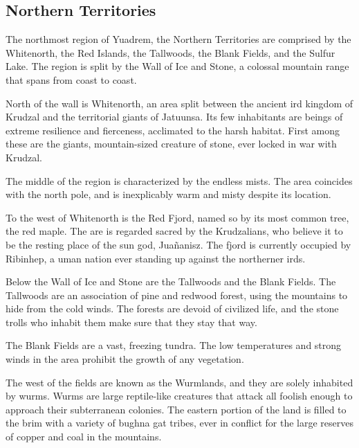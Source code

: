 

\subsection*{Northern Territories} \label{ssec::northernterritories}
The northmost region of Yuadrem, the Northern Territories are comprised by the Whitenorth, the Red Islands, the Tallwoods, the Blank Fields, and the Sulfur Lake.
The region is split by the Wall of Ice and Stone, a colossal mountain range that spans from coast to coast.

North of the wall is Whitenorth, an area split between the ancient ird kingdom of Krudzal and the territorial giants of Jatuunsa.
Its few inhabitants are beings of extreme resilience and fierceness, acclimated to the harsh habitat.
First among these are the giants, mountain-sized creature of stone, ever locked in war with Krudzal.

The middle of the region is characterized by the endless mists.
The area coincides with the north pole, and is inexplicably warm and misty despite its location.

To the west of Whitenorth is the Red Fjord, named so by its most common tree, the red maple.
The are is regarded sacred by the Krudzalians, who believe it to be the resting place of the sun god, Jua\~nanisz.
The fjord is currently occupied by Ribinhep, a uman nation ever standing up against the northerner irds.

Below the Wall of Ice and Stone are the Tallwoods and the Blank Fields.
The Tallwoods are an association of pine and redwood forest, using the mountains to hide from the cold winds.
The forests are devoid of civilized life, and the stone trolls who inhabit them make sure that they stay that way.

The Blank Fields are a vast, freezing tundra.
The low temperatures and strong winds in the area prohibit the growth of any vegetation.

The west of the fields are known as the Wurmlands, and they are solely inhabited by wurms.
Wurms are large reptile-like creatures that attack all foolish enough to approach their subterranean colonies.
The eastern portion of the land is filled to the brim with a variety of bughna gat tribes, ever in conflict for the large reserves of copper and coal in the mountains.

